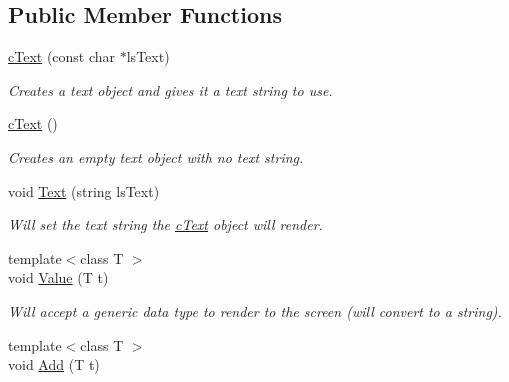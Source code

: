 \subsection*{Public Member Functions}
\begin{DoxyCompactItemize}
\item 
\hypertarget{classc_text_a22c63dd27464b40ed6e30ce5e4244334}{
\hyperlink{classc_text_a22c63dd27464b40ed6e30ce5e4244334}{cText} (const char $\ast$lsText)}
\label{classc_text_a22c63dd27464b40ed6e30ce5e4244334}

\begin{DoxyCompactList}\small\item\em Creates a text object and gives it a text string to use. \end{DoxyCompactList}\item 
\hypertarget{classc_text_a9784e9fa562a9b942a24e1dbfda0f485}{
\hyperlink{classc_text_a9784e9fa562a9b942a24e1dbfda0f485}{cText} ()}
\label{classc_text_a9784e9fa562a9b942a24e1dbfda0f485}

\begin{DoxyCompactList}\small\item\em Creates an empty text object with no text string. \end{DoxyCompactList}\item 
\hypertarget{classc_text_aa9a88fc57967e17f83aaa5466a449b99}{
void \hyperlink{classc_text_aa9a88fc57967e17f83aaa5466a449b99}{Text} (string lsText)}
\label{classc_text_aa9a88fc57967e17f83aaa5466a449b99}

\begin{DoxyCompactList}\small\item\em Will set the text string the \hyperlink{classc_text}{cText} object will render. \end{DoxyCompactList}\item 
\hypertarget{classc_text_a9d26fcb781ea4f2100e428aaf8b19610}{
{\footnotesize template$<$class T $>$ }\\void \hyperlink{classc_text_a9d26fcb781ea4f2100e428aaf8b19610}{Value} (T t)}
\label{classc_text_a9d26fcb781ea4f2100e428aaf8b19610}

\begin{DoxyCompactList}\small\item\em Will accept a generic data type to render to the screen (will convert to a string). \end{DoxyCompactList}\item 
\hypertarget{classc_text_ad6654133a7bf960abb97207d07726978}{
{\footnotesize template$<$class T $>$ }\\void \hyperlink{classc_text_ad6654133a7bf960abb97207d07726978}{Add} (T t)}
\label{classc_text_ad6654133a7bf960abb97207d07726978}


\end{DoxyCompactItemize}
